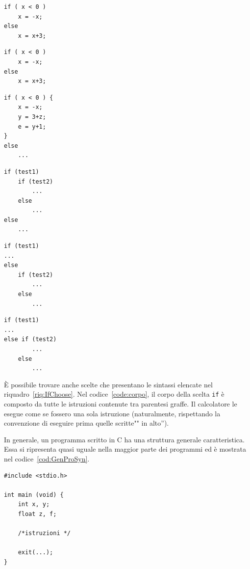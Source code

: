 \begin{code}
\begin{minipage}{0.45\columnwidth}
	\begin{lstlisting}[caption={\ },nolol]
if ( x < 0 )
	x = -x;
else
	x = x+3;
	\end{lstlisting}
\end{minipage}	\hfill
\begin{minipage}{0.45\columnwidth}
	\begin{lstlisting}[caption={\ },nolol]
if ( x < 0 )
	x = -x;
else
	x = x+3;
	\end{lstlisting}
\end{minipage}	\hfill
\begin{minipage}{0.45\columnwidth}
	\begin{lstlisting}[caption={\ },nolol,label={code:corpo}]
if ( x < 0 ) {
	x = -x;
	y = 3+z;
	e = y+1;
}
else
	...
	\end{lstlisting}
\end{minipage}	\hfill
\begin{minipage}{0.45\columnwidth}
\begin{lstlisting}[caption={\ },nolol]
if (test1)
	if (test2)
		...
	else
		...
else
	...
	\end{lstlisting}
\end{minipage}	\hfill
\begin{minipage}{0.45\columnwidth}
	\begin{lstlisting}[caption={\ },nolol]
if (test1) 
...
else
	if (test2)
		...
	else
		...
	\end{lstlisting}
\end{minipage}	\hfill
\begin{minipage}{0.45\columnwidth}
	\begin{lstlisting}[caption={\ },nolol]
if (test1) 
...
else if (test2)
		...
	else
		...
	\end{lstlisting}
\end{minipage}
\caption{Sintassi della scelta \lstinline!if (...)  else!}
\label{riq:IfChoose}
\end{code}
È possibile trovare anche scelte che presentano le sintassi elencate nel riquadro~\vref{riq:IfChoose}. Nel codice~\vref{code:corpo}, il corpo della scelta \lstinline!if! è composto da tutte le istruzioni contenute tra parentesi graffe. Il calcolatore le esegue come se fossero una sola istruzione (naturalmente, rispettando la convenzione di eseguire prima quelle scritte"" in alto'').

In  generale, un programma scritto in C ha una struttura generale caratteristica. Essa si ripresenta quasi uguale nella maggior parte dei programmi ed è mostrata nel codice~\vref{cod:GenProSyn}.
\begin{lstlisting}[caption={[\em Struttura di un programma in linguaggio C.] {Struttura generale di un programma in linguaggio C.}},float,label={cod:GenProSyn}]
#include <stdio.h>

int main (void) {
	int x, y;
	float z, f;

	/*istruzioni */

	exit(...);
}
\end{lstlisting}